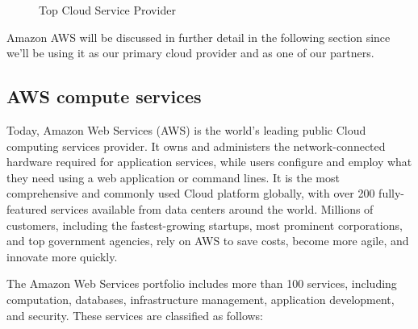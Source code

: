 \begin{figure}[!h]
    \centering
    \caption{Top Cloud Service Provider}
    \label{fig:cloudleader}
    \cite{top_cloud_provider}
\end{figure}

Amazon AWS will be discussed in further detail in the following section since we'll be using it as our primary cloud provider and as one of our partners.

\subsection{AWS compute services}
\qquad 

Today, Amazon Web Services (AWS) is the world's leading public Cloud computing services provider. It owns and administers the network-connected hardware required for application services, while users configure and employ what they need using a web application or command lines.
It is the most comprehensive and commonly used Cloud platform globally, with over 200 fully-featured services available from data centers around the world. Millions of customers, including the fastest-growing startups, most prominent corporations, and top government agencies, rely on AWS to save costs, become more agile, and innovate more quickly.

The Amazon Web Services portfolio includes more than 100 services, including computation, databases, infrastructure management, application development, and security. These services are classified as follows:


